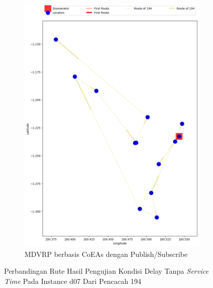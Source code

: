 \begin{figure}[H]\ContinuedFloat
	\centering
	\begin{subfigure}[t]{\textwidth}
		\centering
		\includegraphics[width=\textwidth]{Resources/Images/delayed_7/real_m15_n100_delayed_7_194_pubsub_coes}
		\caption{MDVRP berbasis CoEAs dengan Publish/Subscribe}
		\label{fig:real_m15_n100_delayed_7_194_pubsub_coes}
	\end{subfigure}
	\caption{Perbandingan Rute Hasil Pengujian Kondisi Delay Tanpa \textit{Service Time} Pada Instance d07 Dari Pencacah 194}
	\label{fig:real_m15_n100_delayed_7_194_contd}
\end{figure}


